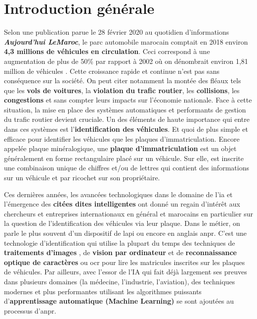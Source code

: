 \chapter*{\textbf{Introduction générale}}
Selon une publication parue le 28 février 2020 au quotidien d'informations \textbf{\textit{Aujourd'hui LeMaroc}}, le parc automobile marocain comptait en 2018 environ \textbf{4,3 millions de véhicules en circulation}. Ceci correspond à une augmentation de plus de 50\% par rapport à 2002 où on dénombrait environ 1,81 million de véhicules \cite{ajLeMaroc}. Cette croissance rapide et continue n’est pas sans conséquence sur la société. On peut citer notamment la montée des fléaux tels que les \textbf{vols de voitures}, la \textbf{violation du trafic routier}, les \textbf{collisions}, les \textbf{congestions} et sans compter leurs impacts sur l’économie nationale. Face à cette situation, la mise en place des systèmes automatiques et performants de gestion du trafic routier devient cruciale. Un des éléments de haute importance qui entre dans ces systèmes est l’\textbf{identification des véhicules}. Et quoi de plus simple et efficace pour identifier les véhicules que les plaques d’immatriculation. Encore appelée plaque minéralogique, une \textbf{plaque d’immatriculation} est un objet généralement en forme rectangulaire placé sur un véhicule. Sur elle, est inscrite une combinaison unique de chiffres et/ou de lettres qui contient des informations sur un véhicule et par ricochet sur son propriétaire. 

Ces dernières années, les avancées technologiques dans le domaine de l’\acrfull{ia} et l'émergence des \textbf{citées dites intelligentes} ont donné un regain d'intérêt aux chercheurs et entreprises internationaux en général et marocains en particulier sur la question de l’identification des véhicules via leur plaque. Dans le métier, on  parle le plus souvent d’un dispositif de \acrfull{lapi} ou encore en anglais \acrfull{anpr}. C’est une technologie d’identification qui utilise la plupart du temps des techniques de \textbf{traitements d’images} , de \textbf{vision par ordinateur} et de \textbf{reconnaissance optique de caractères} ou \acrfull{ocr} pour lire les matricules inscrites sur les plaques de véhicules. Par ailleurs, avec l’essor de l’IA qui fait déjà largement ses preuves dans plusieurs domaines (la médecine, l’industrie, l’aviation), des techniques modernes et plus performantes utilisant les algorithmes puissants d’\textbf{apprentissage automatique (Machine Learning)} se sont ajoutées au processus d’\acrshort{anpr}. 

